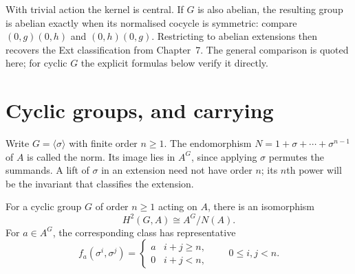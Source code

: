 With trivial action the kernel is central. If $G$ is also abelian, the resulting group is abelian exactly when its normalised cocycle is symmetric: compare $(0,g)(0,h)$ and $(0,h)(0,g)$. Restricting to abelian extensions then recovers the Ext classification from Chapter~7. The general comparison is quoted here; for cyclic $G$ the explicit formulas below verify it directly.

\section{Cyclic groups, and carrying}

Write $G=\langle\sigma\rangle$ with finite order $n\ge1$. The endomorphism
$N=1+\sigma+\cdots+\sigma^{n-1}$ of $A$ is called the norm. Its image lies in $A^G$, since applying $\sigma$ permutes the summands. A lift of $\sigma$ in an extension need not have order $n$; its $n$th power will be the invariant that classifies the extension.

\begin{theorem}\label{thm:h2cyclic}
For a cyclic group $G$ of order $n\ge1$ acting on $A$, there is an isomorphism
\[
H^2(G,A)\cong A^G/N(A).
\]
For $a\in A^G$, the corresponding class has representative
\[
f_a(\sigma^i,\sigma^j)=
\begin{cases}a&i+j\ge n,\\0&i+j<n,\end{cases}
\qquad 0\le i,j<n.
\]
\end{theorem}

